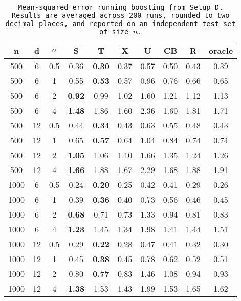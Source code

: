 \begin{table}[ht]
\centering
\begin{tabular}{cccccccccc}
  \hline
n & d & $\sigma$ & S & T & X & U & CB & R & oracle \\ 
  \hline
500 & 6 & 0.5 & 0.36 & \bf 0.30 & 0.37 & 0.57 & 0.50 & 0.43 & 0.39 \\ 
  500 & 6 & 1 & 0.55 & \bf 0.53 & 0.57 & 0.96 & 0.76 & 0.66 & 0.65 \\ 
  500 & 6 & 2 & \bf 0.92 & 0.99 & 1.02 & 1.60 & 1.21 & 1.12 & 1.13 \\ 
  500 & 6 & 4 & \bf 1.48 & 1.86 & 1.60 & 2.36 & 1.60 & 1.81 & 1.71 \\ 
  500 & 12 & 0.5 & 0.44 & \bf 0.34 & 0.43 & 0.63 & 0.55 & 0.48 & 0.43 \\ 
  500 & 12 & 1 & 0.65 & \bf 0.57 & 0.64 & 1.04 & 0.84 & 0.74 & 0.74 \\ 
  500 & 12 & 2 & \bf 1.05 & 1.06 & 1.10 & 1.66 & 1.35 & 1.24 & 1.26 \\ 
  500 & 12 & 4 & \bf 1.66 & 1.88 & 1.67 & 2.29 & 1.68 & 1.88 & 1.91 \\ 
  1000 & 6 & 0.5 & 0.24 & \bf 0.20 & 0.25 & 0.42 & 0.41 & 0.29 & 0.26 \\ 
  1000 & 6 & 1 & 0.39 & \bf 0.36 & 0.40 & 0.73 & 0.56 & 0.46 & 0.45 \\ 
  1000 & 6 & 2 & \bf 0.68 & 0.71 & 0.73 & 1.33 & 0.94 & 0.81 & 0.83 \\ 
  1000 & 6 & 4 & \bf 1.23 & 1.45 & 1.34 & 1.98 & 1.41 & 1.44 & 1.51 \\ 
  1000 & 12 & 0.5 & 0.29 & \bf 0.22 & 0.28 & 0.47 & 0.41 & 0.32 & 0.30 \\ 
  1000 & 12 & 1 & 0.45 & \bf 0.38 & 0.45 & 0.78 & 0.62 & 0.52 & 0.51 \\ 
  1000 & 12 & 2 & 0.80 & \bf 0.77 & 0.83 & 1.46 & 1.08 & 0.94 & 0.93 \\ 
  1000 & 12 & 4 & \bf 1.38 & 1.53 & 1.43 & 1.99 & 1.53 & 1.65 & 1.62 \\ 
   \hline
\end{tabular}
\caption{\tt Mean-squared error running \texttt{boosting} from Setup D. Results are averaged across 200 runs, rounded to two decimal places, and reported on an independent test set of size $n$.} 
\label{table:setup4}
\end{table}
